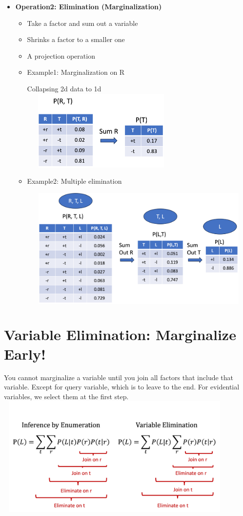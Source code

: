 \documentclass[11pt,a4paper]{report}
\begin{document}
\begin{itemize}
    \item \textbf{Operation2: Elimination (Marginalization)}
        \begin{itemize}
            \item Take a factor and sum out a variable
            \item Shrinks a factor to a smaller one
            \item A projection operation
            \item Example1: Marginalization on R
            
            Collapsing 2d data to 1d\\
            \includegraphics[width=8cm, height = 4cm]{op2_eli.png}

            \item Example2: Multiple elimination
            
            \includegraphics[width=14cm, height = 6cm]{op2_meli.png}
        \end{itemize}
\end{itemize}

\section{Variable Elimination: Marginalize Early!}

You cannot marginalize a variable until you join all factors that include that variable. Except for query variable, which is to leave to the end. For evidential variables, we select them at the first step. 
\includegraphics[width=12cm, height = 6cm]{traffic_eg2.png}
\end{document}
